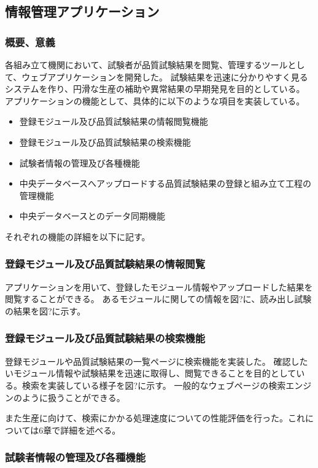 \subsection{情報管理アプリケーション}
\subsubsection{概要、意義}
各組み立て機関において、試験者が品質試験結果を閲覧、管理するツールとして、ウェブアプリケーションを開発した。
試験結果を迅速に分かりやすく見るシステムを作り、円滑な生産の補助や異常結果の早期発見を目的としている。
アプリケーションの機能として、具体的に以下のような項目を実装している。

\begin{itemize}
  \item 登録モジュール及び品質試験結果の情報閲覧機能
  \item 登録モジュール及び品質試験結果の検索機能
  \item 試験者情報の管理及び各種機能
  \item 中央データベースへアップロードする品質試験結果の登録と組み立て工程の管理機能
  \item 中央データベースとのデータ同期機能
\end{itemize}

それぞれの機能の詳細を以下に記す。

\subsubsection{登録モジュール及び品質試験結果の情報閲覧}
アプリケーションを用いて、登録したモジュール情報やアップロードした結果を閲覧することができる。
あるモジュールに関しての情報を図?に、読み出し試験の結果を図?に示す。

\subsubsection{登録モジュール及び品質試験結果の検索機能}
登録モジュールや品質試験結果の一覧ページに検索機能を実装した。
確認したいモジュール情報や試験結果を迅速に取得し、閲覧できることを目的としている。検索を実装している様子を図?に示す。
一般的なウェブページの検索エンジンのように扱うことができる。

また生産に向けて、検索にかかる処理速度についての性能評価を行った。これについては6章で詳細を述べる。

\subsubsection{試験者情報の管理及び各種機能}

